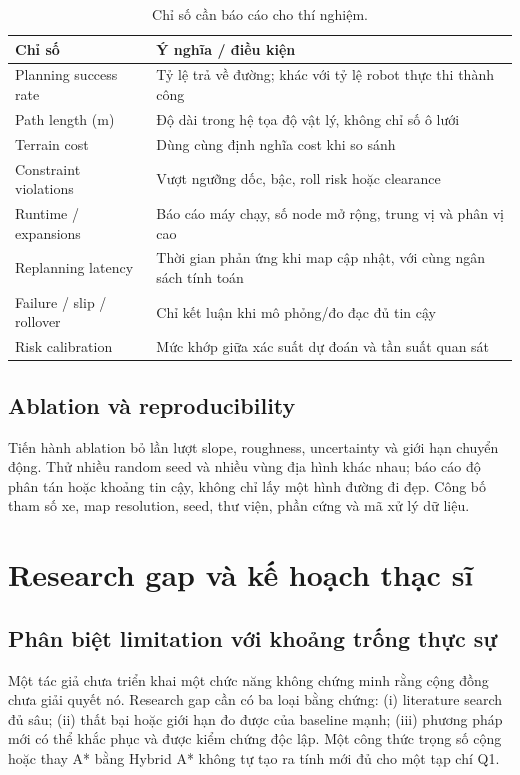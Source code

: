 \documentclass[11pt,a4paper]{article}
\begin{document}
\begin{table}[htbp]
\centering\small
\caption{Chỉ số cần báo cáo cho thí nghiệm.}
\begin{tabularx}{\textwidth}{@{}p{3.2cm}Y@{}}
\toprule
Chỉ số & Ý nghĩa / điều kiện \\
\midrule
Planning success rate & Tỷ lệ trả về đường; khác với tỷ lệ robot thực thi thành công \\
Path length (m) & Độ dài trong hệ tọa độ vật lý, không chỉ số ô lưới \\
Terrain cost & Dùng cùng định nghĩa cost khi so sánh \\
Constraint violations & Vượt ngưỡng dốc, bậc, roll risk hoặc clearance \\
Runtime / expansions & Báo cáo máy chạy, số node mở rộng, trung vị và phân vị cao \\
Replanning latency & Thời gian phản ứng khi map cập nhật, với cùng ngân sách tính toán \\
Failure / slip / rollover & Chỉ kết luận khi mô phỏng/đo đạc đủ tin cậy \\
Risk calibration & Mức khớp giữa xác suất dự đoán và tần suất quan sát \\
\bottomrule
\end{tabularx}
\end{table}

\subsection{Ablation và reproducibility}
Tiến hành ablation bỏ lần lượt slope, roughness,
uncertainty và giới hạn chuyển động.
Thử nhiều random seed và nhiều vùng địa hình khác nhau;
báo cáo độ phân tán hoặc khoảng tin cậy,
không chỉ lấy một hình đường đi đẹp.
Công bố tham số xe, map resolution, seed, thư viện,
phần cứng và mã xử lý dữ liệu.

\section{Research gap và kế hoạch thạc sĩ}
\subsection{Phân biệt limitation với khoảng trống thực sự}
Một tác giả chưa triển khai một chức năng không chứng minh
rằng cộng đồng chưa giải quyết nó. Research gap cần có
ba loại bằng chứng: (i) literature search đủ sâu;
(ii) thất bại hoặc giới hạn đo được của baseline mạnh;
(iii) phương pháp mới có thể khắc phục và được kiểm chứng độc lập.
Một công thức trọng số cộng hoặc thay A* bằng Hybrid A*
không tự tạo ra tính mới đủ cho một tạp chí Q1.
\end{document}
